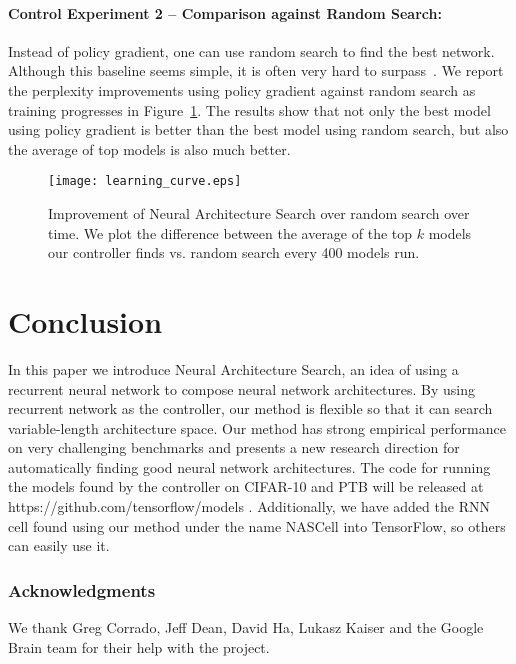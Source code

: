 \documentclass{article} \usepackage{iclr2017_conference,times}
\begin{document}
\paragraph{Control Experiment 2 -- Comparison against Random Search:} Instead of policy gradient, one can use random search to find the best network. Although this baseline seems simple, it is often very hard to surpass~\citep{bergstra2012random}. We report the perplexity improvements using policy gradient against random search as training progresses in Figure~\ref{fig:learning_curve}. The results show that not only the best model using policy gradient is better than the best model using random search, but also the average of top models is also much better.

\begin{figure}[h!]
\begin{center}
  \texttt{[image: learning\_curve.eps]}
\caption{Improvement of Neural Architecture Search over random search over time. We plot the difference between the average of the top $k$ models our controller finds vs. random search every 400 models run.}
\label{fig:learning_curve}
\end{center}
\end{figure}














\section{Conclusion}

In this paper we introduce Neural Architecture Search, an idea of using a recurrent neural network to compose neural network architectures. By using recurrent network as the controller, our method is flexible so that it can search variable-length architecture space. Our method has strong empirical performance on very challenging benchmarks and presents a new research direction for automatically finding good neural network architectures. The code for running the models found by the controller on CIFAR-10 and PTB will be released at https://github.com/tensorflow/models . Additionally, we have added the RNN cell found using our method under the name NASCell into TensorFlow, so others can easily use it.

\subsubsection*{Acknowledgments}
We thank Greg Corrado, Jeff Dean, David Ha, Lukasz Kaiser and the Google Brain team for their help with the project.
\end{document}
